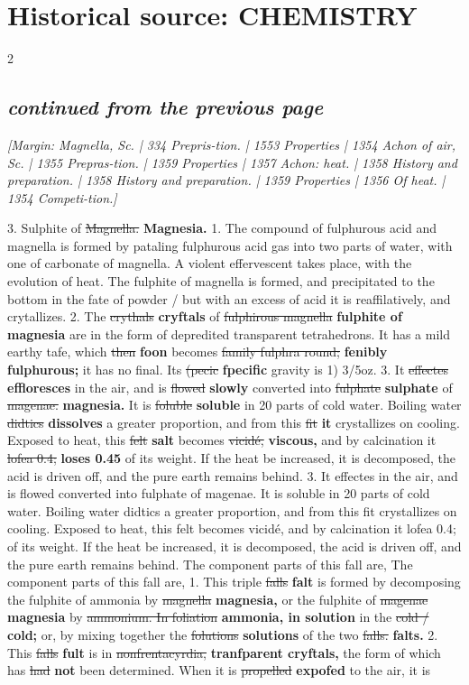 \documentclass[10pt]{article}
\begin{document}
\section*{Historical source: CHEMISTRY}
\begin{multicols}{2}
\subsection*{\textit{continued from the previous page}}
{\small\itshape [Margin: Magnella, Sc. | 334 Prepris-tion. | 1553 Properties | 1354 Achon of air, Sc. | 1355 Prepras-tion. | 1359 Properties | 1357 Achon: heat. | 1358 History and preparation. | 1358 History and preparation. | 1359 Properties | 1356 Of heat. | 1354 Competi-tion.]}\par
3. Sulphite of \sout{Magnella.} \textbf{Magnesia.} 1. The compound of fulphurous acid and magnella is formed by pataling fulphurous acid gas into two parts of water, with one of carbonate of magnella. A violent effervescent takes place, with the evolution of heat. The fulphite of magnella is formed, and precipitated to the bottom in the fate of powder / but with an excess of acid it is reaffilatively, and crytallizes. 2. The \sout{crythals} \textbf{cryftals} of \sout{fulphirous magnella} \textbf{fulphite of magnesia} are in the form of depredited transparent tetrahedrons. It has a mild earthy tafe, which \sout{then} \textbf{foon} becomes \sout{family fulphra round;} \textbf{fenibly fulphurous;} it has no final. Its \sout{(pecic} \textbf{fpecific} gravity is 1) 3/5oz. 3. It \sout{effectes} \textbf{effloresces} in the air, and is \sout{flowed} \textbf{slowly} converted into \sout{fulphate} \textbf{sulphate} of \sout{magenae.} \textbf{magnesia.} It is \sout{foluble} \textbf{soluble} in 20 parts of cold water. Boiling water \sout{didtics} \textbf{dissolves} a greater proportion, and from this \sout{fit} \textbf{it} crystallizes on cooling. Exposed to heat, this \sout{felt} \textbf{salt} becomes \sout{vicidé,} \textbf{viscous,} and by calcination it \sout{lofea 0.4;} \textbf{loses 0.45} of its weight. If the heat be increased, it is decomposed, the acid is driven off, and the pure earth remains behind. 3. It effectes in the air, and is flowed converted into fulphate of magenae. It is soluble in 20 parts of cold water. Boiling water didtics a greater proportion, and from this fit crystallizes on cooling. Exposed to heat, this felt becomes vicidé, and by calcination it lofea 0.4; of its weight. If the heat be increased, it is decomposed, the acid is driven off, and the pure earth remains behind. The component parts of this fall are, The component parts of this fall are, 1. This triple \sout{falls} \textbf{falt} is formed by decomposing the fulphite of ammonia by \sout{magnella} \textbf{magnesia,} or the fulphite of \sout{magenae} \textbf{magnesia} by \sout{ammonium. In foliation} \textbf{ammonia, in solution} in the \sout{cold /} \textbf{cold;} or, by mixing together the \sout{folutions} \textbf{solutions} of the two \sout{falls.} \textbf{falts.} 2. This \sout{falls} \textbf{fult} is in \sout{nonfrentacyrdia,} \textbf{tranfparent cryftals,} the form of which has \sout{had} \textbf{not} been determined. When it is \sout{propelled} \textbf{expofed} to the air, it is 
\end{multicols}
\end{document}

